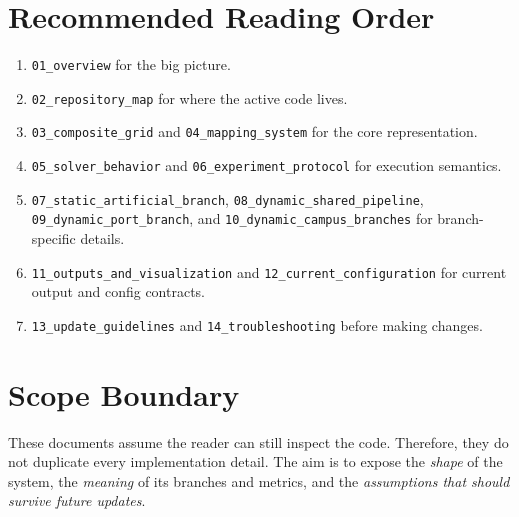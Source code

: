 \documentclass[11pt]{article}
\begin{document}
\section{Recommended Reading Order}

\begin{enumerate}[leftmargin=2em]
    \item \texttt{01\_overview} for the big picture.
    \item \texttt{02\_repository\_map} for where the active code lives.
    \item \texttt{03\_composite\_grid} and \texttt{04\_mapping\_system} for the core representation.
    \item \texttt{05\_solver\_behavior} and \texttt{06\_experiment\_protocol} for execution semantics.
    \item \texttt{07\_static\_artificial\_branch}, \texttt{08\_dynamic\_shared\_pipeline}, \texttt{09\_dynamic\_port\_branch}, and \texttt{10\_dynamic\_campus\_branches} for branch-specific details.
    \item \texttt{11\_outputs\_and\_visualization} and \texttt{12\_current\_configuration} for current output and config contracts.
    \item \texttt{13\_update\_guidelines} and \texttt{14\_troubleshooting} before making changes.
\end{enumerate}

\section{Scope Boundary}

These documents assume the reader can still inspect the code. Therefore, they do not duplicate every implementation detail. The aim is to expose the \emph{shape} of the system, the \emph{meaning} of its branches and metrics, and the \emph{assumptions that should survive future updates}.
\end{document}
